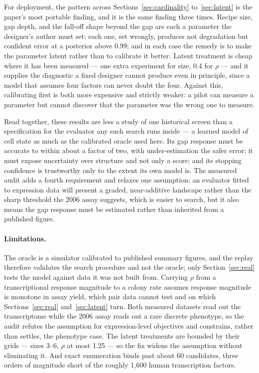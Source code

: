 \documentclass[10pt]{article}
\begin{document}
For deployment, the pattern across Sections~\ref{sec:cardinality}
to~\ref{sec:latent} is the paper's most portable finding, and it is the same
finding three times. Recipe size, gap depth, and the fall-off shape beyond the
gap are each a parameter the designer's author must set; each one, set wrongly,
produces not degradation but confident error at a posterior above 0.99; and in
each case the remedy is to make the parameter latent rather than to calibrate
it better. Latent treatment is cheap where it has been measured --- one extra
experiment for size, 0.4 for $\rho$ --- and it supplies the diagnostic a fixed
designer cannot produce even in principle, since a model that assumes four
factors can never doubt the four. Against this, calibrating first is both more
expensive and strictly weaker: a pilot can measure a parameter but cannot
discover that the parameter was the wrong one to measure.

Read together, these results are less a study of one historical screen than a
specification for the evaluator any such search runs inside --- a learned model
of cell state as much as the calibrated oracle used here. Its gap response must
be accurate to within about a factor of two, with under-estimation the safer
error; it must expose uncertainty over structure and not only a score; and its
stopping confidence is trustworthy only to the extent its own model is. The
measured audit adds a fourth requirement and relaxes one assumption: an
evaluator fitted to expression data will present a graded, near-additive
landscape rather than the sharp threshold the 2006 assay suggests, which is
easier to search, but it also means the gap response must be estimated rather
than inherited from a published figure.

\paragraph{Limitations.} The oracle is a simulator calibrated to published
summary figures, and the replay therefore validates the search procedure and
not the oracle; only Section~\ref{sec:real} tests the model against data it was
not built from. Carrying $\rho$ from a transcriptional response magnitude to a
colony rate assumes response magnitude is monotone in assay yield, which pair
data cannot test and on which Sections~\ref{sec:real} and~\ref{sec:latent}
turn. Both measured datasets read out the transcriptome while the 2006 assay
reads out a rare discrete phenotype, so the audit refutes the assumption for
expression-level objectives and constrains, rather than settles, the phenotype
case. The latent treatments are bounded by their grids --- sizes 3--6, $\rho$ at
most 1.25 --- so the fix widens the assumption without eliminating it. And
exact enumeration binds past about 60 candidates, three orders of magnitude
short of the roughly 1,600 human transcription factors.
\end{document}
